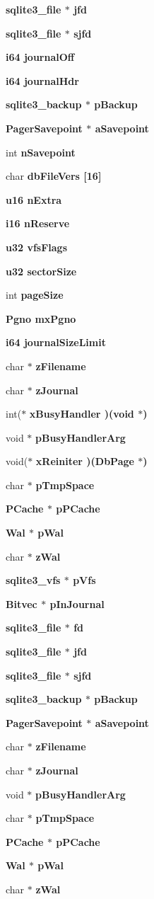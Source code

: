 \begin{CompactItemize}
\bf{sqlite3\_\-file} $\ast$ \bf{jfd}
\item 
\bf{sqlite3\_\-file} $\ast$ \bf{sjfd}
\item 
\bf{i64} \bf{journal\-Off}
\item 
\bf{i64} \bf{journal\-Hdr}
\item 
\bf{sqlite3\_\-backup} $\ast$ \bf{p\-Backup}
\item 
\bf{Pager\-Savepoint} $\ast$ \bf{a\-Savepoint}
\item 
int \bf{n\-Savepoint}
\item 
char \bf{db\-File\-Vers} [16]
\item 
\bf{u16} \bf{n\-Extra}
\item 
\bf{i16} \bf{n\-Reserve}
\item 
\bf{u32} \bf{vfs\-Flags}
\item 
\bf{u32} \bf{sector\-Size}
\item 
int \bf{page\-Size}
\item 
\bf{Pgno} \bf{mx\-Pgno}
\item 
\bf{i64} \bf{journal\-Size\-Limit}
\item 
char $\ast$ \bf{z\-Filename}
\item 
char $\ast$ \bf{z\-Journal}
\item 
int($\ast$ \bf{x\-Busy\-Handler} )(void $\ast$)
\item 
void $\ast$ \bf{p\-Busy\-Handler\-Arg}
\item 
void($\ast$ \bf{x\-Reiniter} )(\bf{Db\-Page} $\ast$)
\item 
char $\ast$ \bf{p\-Tmp\-Space}
\item 
\bf{PCache} $\ast$ \bf{p\-PCache}
\item 
\bf{Wal} $\ast$ \bf{p\-Wal}
\item 
char $\ast$ \bf{z\-Wal}
\item 
\bf{sqlite3\_\-vfs} $\ast$ \bf{p\-Vfs}
\item 
\bf{Bitvec} $\ast$ \bf{p\-In\-Journal}
\item 
\bf{sqlite3\_\-file} $\ast$ \bf{fd}
\item 
\bf{sqlite3\_\-file} $\ast$ \bf{jfd}
\item 
\bf{sqlite3\_\-file} $\ast$ \bf{sjfd}
\item 
\bf{sqlite3\_\-backup} $\ast$ \bf{p\-Backup}
\item 
\bf{Pager\-Savepoint} $\ast$ \bf{a\-Savepoint}
\item 
char $\ast$ \bf{z\-Filename}
\item 
char $\ast$ \bf{z\-Journal}
\item 
void $\ast$ \bf{p\-Busy\-Handler\-Arg}
\item 
char $\ast$ \bf{p\-Tmp\-Space}
\item 
\bf{PCache} $\ast$ \bf{p\-PCache}
\item 
\bf{Wal} $\ast$ \bf{p\-Wal}
\item 
char $\ast$ \bf{z\-Wal}
\end{CompactItemize}


